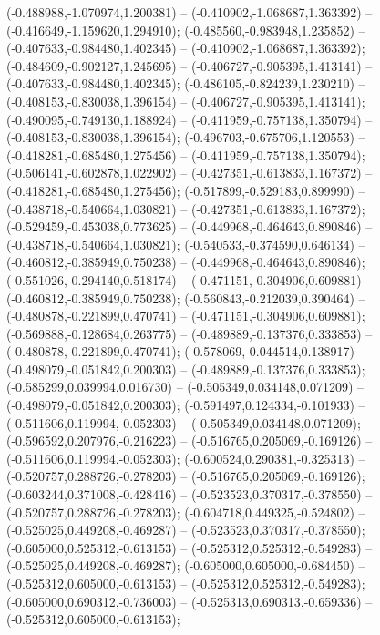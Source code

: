  (-0.488988,-1.070974,1.200381) -- (-0.410902,-1.068687,1.363392) -- (-0.416649,-1.159620,1.294910);
 (-0.485560,-0.983948,1.235852) -- (-0.407633,-0.984480,1.402345) -- (-0.410902,-1.068687,1.363392);
 (-0.484609,-0.902127,1.245695) -- (-0.406727,-0.905395,1.413141) -- (-0.407633,-0.984480,1.402345);
 (-0.486105,-0.824239,1.230210) -- (-0.408153,-0.830038,1.396154) -- (-0.406727,-0.905395,1.413141);
 (-0.490095,-0.749130,1.188924) -- (-0.411959,-0.757138,1.350794) -- (-0.408153,-0.830038,1.396154);
 (-0.496703,-0.675706,1.120553) -- (-0.418281,-0.685480,1.275456) -- (-0.411959,-0.757138,1.350794);
 (-0.506141,-0.602878,1.022902) -- (-0.427351,-0.613833,1.167372) -- (-0.418281,-0.685480,1.275456);
 (-0.517899,-0.529183,0.899990) -- (-0.438718,-0.540664,1.030821) -- (-0.427351,-0.613833,1.167372);
 (-0.529459,-0.453038,0.773625) -- (-0.449968,-0.464643,0.890846) -- (-0.438718,-0.540664,1.030821);
 (-0.540533,-0.374590,0.646134) -- (-0.460812,-0.385949,0.750238) -- (-0.449968,-0.464643,0.890846);
 (-0.551026,-0.294140,0.518174) -- (-0.471151,-0.304906,0.609881) -- (-0.460812,-0.385949,0.750238);
 (-0.560843,-0.212039,0.390464) -- (-0.480878,-0.221899,0.470741) -- (-0.471151,-0.304906,0.609881);
 (-0.569888,-0.128684,0.263775) -- (-0.489889,-0.137376,0.333853) -- (-0.480878,-0.221899,0.470741);
 (-0.578069,-0.044514,0.138917) -- (-0.498079,-0.051842,0.200303) -- (-0.489889,-0.137376,0.333853);
 (-0.585299,0.039994,0.016730) -- (-0.505349,0.034148,0.071209) -- (-0.498079,-0.051842,0.200303);
 (-0.591497,0.124334,-0.101933) -- (-0.511606,0.119994,-0.052303) -- (-0.505349,0.034148,0.071209);
 (-0.596592,0.207976,-0.216223) -- (-0.516765,0.205069,-0.169126) -- (-0.511606,0.119994,-0.052303);
 (-0.600524,0.290381,-0.325313) -- (-0.520757,0.288726,-0.278203) -- (-0.516765,0.205069,-0.169126);
 (-0.603244,0.371008,-0.428416) -- (-0.523523,0.370317,-0.378550) -- (-0.520757,0.288726,-0.278203);
 (-0.604718,0.449325,-0.524802) -- (-0.525025,0.449208,-0.469287) -- (-0.523523,0.370317,-0.378550);
 (-0.605000,0.525312,-0.613153) -- (-0.525312,0.525312,-0.549283) -- (-0.525025,0.449208,-0.469287);
 (-0.605000,0.605000,-0.684450) -- (-0.525312,0.605000,-0.613153) -- (-0.525312,0.525312,-0.549283);
 (-0.605000,0.690312,-0.736003) -- (-0.525313,0.690313,-0.659336) -- (-0.525312,0.605000,-0.613153);
